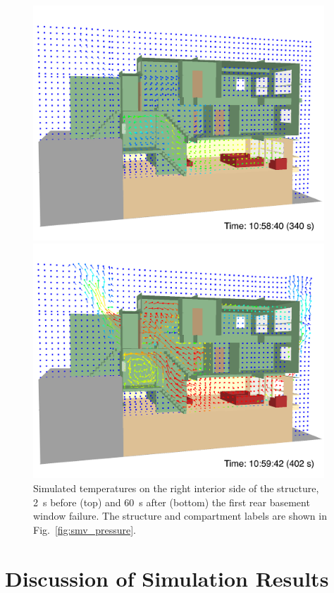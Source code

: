 \documentclass[12pt,oneside]{book}
\begin{document}
\begin{figure}[!ht]
\includegraphics[width=4.3in]{../Figures/SMV_Temp_Vec_340_s}


\includegraphics[width=4.3in]{../Figures/SMV_Temp_Vec_402_s}


\caption[Simulated temperatures on the right interior side of the structure.]
{Simulated temperatures on the right interior side of the structure, 2~s before (top) and 60~s after (bottom) the first rear basement window failure. The structure and compartment labels are shown in Fig.~\ref{fig:smv_pressure}.}
\label{fig:smv_temperature_vectors}
\end{figure}


\chapter{Discussion of Simulation Results}
\label{sec:discussion}
\end{document}
